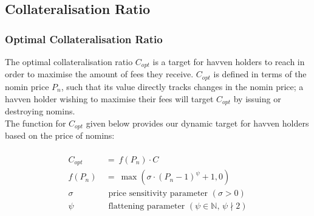 \newpage
\subsection{Collateralisation Ratio}
\subsubsection{Optimal Collateralisation Ratio}

\noindent The optimal collateralisation ratio \(C_{opt}\) is a target for
havven holders to reach in order to maximise the amount of fees they receive.
\(C_{opt}\) is defined in terms of the nomin price \(P_n\), such that its value
directly tracks changes in the nomin price; a havven holder wishing to
maximise their fees will target \(C_{opt}\) by issuing or destroying nomins. \\

\noindent The function for \(C_{opt}\) given below provides our dynamic target
for havven holders based on the price of nomins:

\begin{gather} \label{eq:optcollateralisation}
\begin{align}
\begin{split}
C_{opt} \ &= \ f(P_{n}) \cdot C  \\ 
f(P_n) \ &= \ \max(\sigma \cdot {(P_n - 1)}^{\psi} + 1, 0) \\
\sigma \ & \text{ \ price sensitivity parameter } (\sigma > 0)\\
\psi   \ & \text{ \ flattening parameter } (\psi \in \mathbb{N} \text{, } \psi \nmid 2) \\
\end{split}
\end{align}
\end{gather}


\begin{center}
\end{center}

